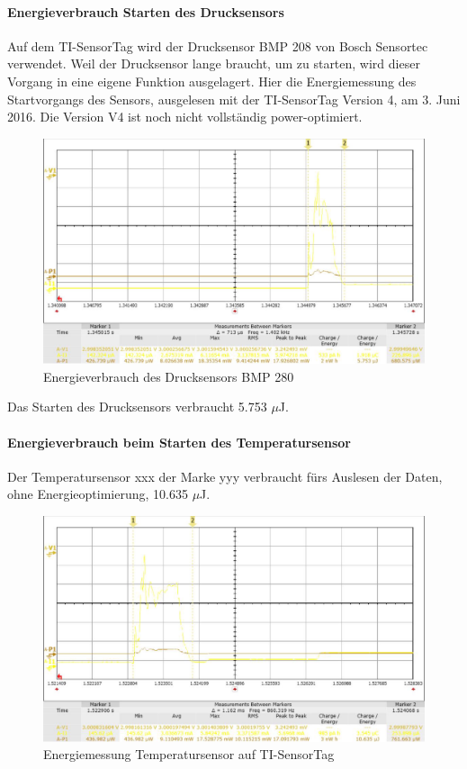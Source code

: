 \paragraph{Energieverbrauch Starten des Drucksensors}

Auf dem TI-SensorTag wird der Drucksensor BMP 208 von Bosch Sensortec verwendet. Weil der Drucksensor lange  braucht, um zu starten, wird dieser Vorgang in eine eigene Funktion ausgelagert. Hier die Energiemessung des Startvorgangs des Sensors, ausgelesen mit der TI-SensorTag Version 4, am 3. Juni 2016. Die Version V4 ist noch nicht vollständig power-optimiert.

\begin{figure}[ht]
  \includegraphics[width=1.0\textwidth]{3Vorgehen/imag/Drucksensor.png}
  \caption{Energieverbrauch des Drucksensors BMP 280}
  \label{energie_drucksensor}
\end{figure}

Das Starten des Drucksensors verbraucht 5.753 $\mu$J.

\paragraph{Energieverbrauch beim Starten des Temperatursensor}

Der Temperatursensor xxx der Marke yyy verbraucht fürs Auslesen der Daten, ohne Energieoptimierung, 10.635 $\mu$J.

\begin{figure}[ht]
  \includegraphics[width=1.0\textwidth]{3Vorgehen/imag/tempSensor.png}
  \caption{Energiemessung Temperatursensor auf TI-SensorTag}
  \label{energie_tempsensor}
\end{figure}


